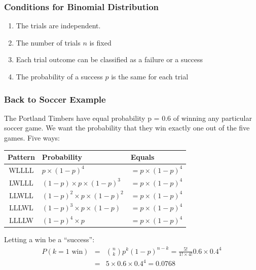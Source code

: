 \documentclass[handout]{beamer}
\newcommand{\blue}[1]{\textcolor{blue2}{#1}}
\begin{document}
\begin{frame}
\frametitle{Conditions for Binomial Distribution}

\begin{enumerate}
\pause\item The trials are independent.
\pause\item The number of trials $n$ is fixed
\pause\item Each trial outcome can be classified as a failure or a success
\pause\item The probability of a success $p$ is the same for each trial
\end{enumerate}

\end{frame}


\begin{frame}
\frametitle{Back to Soccer Example}
The Portland Timbers have equal probability p = 0.6 of winning any particular soccer game. We want the probability that they win \blue{exactly one} out of the five games.  Five ways:

\pause\begin{center}
\begin{tabular}{c|ll}
Pattern & Probability & Equals\\
\hline
\blue{WLLLL} & $p \times (1-p)^4$ & $=p\times(1-p)^4$\\
\blue{LWLLL} & $(1-p) \times p \times (1-p)^3$ & $=p\times(1-p)^4$\\
\blue{LLWLL} & $(1-p)^2 \times p \times (1-p)^2$& $=p\times(1-p)^4$\\
\blue{LLLWL} & $(1-p)^3 \times p \times (1-p)$& $=p\times(1-p)^4$\\
\blue{LLLLW} & $(1-p)^4 \times p$& $=p\times(1-p)^4$\\
\end{tabular} 
\end{center}

\pause Letting a win be a ``success'':
\begin{eqnarray*}
P(\mbox{$k=1$ win}) &=& {n \choose k} p^k (1-p)^{n-k} = \frac{5!}{1!\times4!} 0.6 \times 0.4^4\\
&=& 5 \times  0.6 \times 0.4^4 = 0.0768
\end{eqnarray*}

\end{frame}
\end{document}
